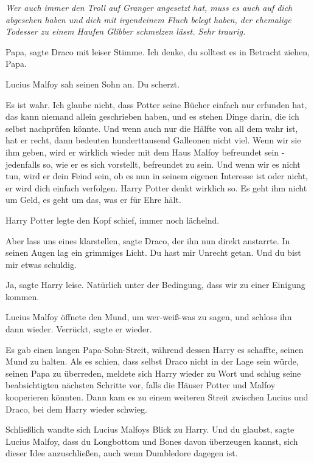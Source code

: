 \emph{Wer auch immer den Troll auf Granger angesetzt hat, muss es auch auf dich
abgesehen haben und dich mit irgendeinem Fluch belegt haben, der ehemalige
Todesser zu einem Haufen Glibber schmelzen lässt. Sehr traurig.}

\glqq{}Papa\grqq{}, sagte Draco mit leiser Stimme. \glqq{}Ich denke, du solltest
es in Betracht ziehen, Papa.\grqq{}

Lucius Malfoy sah seinen Sohn an. \glqq{}Du scherzt.\grqq{}

\glqq{}Es ist wahr. Ich glaube nicht, dass Potter seine Bücher einfach nur
erfunden hat, das kann niemand allein geschrieben haben, und es stehen Dinge
darin, die ich selbst nachprüfen könnte. Und wenn auch nur die Hälfte von all
dem wahr ist, hat er recht, dann bedeuten hunderttausend Galleonen nicht viel.
Wenn wir sie ihm geben, wird er wirklich wieder mit dem Haus Malfoy befreundet
sein - jedenfalls so, wie er es sich vorstellt, befreundet zu sein. Und wenn wir
es nicht tun, wird er dein Feind sein, ob es nun in seinem eigenen Interesse ist
oder nicht, er wird dich einfach verfolgen. Harry Potter denkt wirklich so. Es
geht ihm nicht um Geld, es geht um das, was er für Ehre hält.\grqq{}

Harry Potter legte den Kopf schief, immer noch lächelnd.

\glqq{}Aber lass uns eines klarstellen\grqq{}, sagte Draco, der ihn nun direkt
anstarrte. In seinen Augen lag ein grimmiges Licht. \glqq{}Du hast mir Unrecht
getan. Und du bist mir etwas schuldig.\grqq{}

\glqq{}Ja\grqq{}, sagte Harry leise. \glqq{}Natürlich unter der Bedingung, dass
wir zu einer Einigung kommen.\grqq{}

Lucius Malfoy öffnete den Mund, um wer-weiß-was zu sagen, und schloss ihn dann
wieder. \glqq{}Verrückt\grqq{}, sagte er wieder.

Es gab einen langen Papa-Sohn-Streit, während dessen Harry es schaffte, seinen
Mund zu halten. Als es schien, dass selbst Draco nicht in der Lage sein würde,
seinen Papa zu überreden, meldete sich Harry wieder zu Wort und schlug seine
beabsichtigten nächsten Schritte vor, falls die Häuser Potter und Malfoy
kooperieren könnten. Dann kam es zu einem weiteren Streit zwischen Lucius und
Draco, bei dem Harry wieder schwieg.

Schließlich wandte sich Lucius Malfoys Blick zu Harry. \glqq{}Und du
glaubst\grqq{}, sagte Lucius Malfoy, \glqq{}dass du Longbottom und Bones davon
überzeugen kannst, sich dieser Idee anzuschließen, auch wenn Dumbledore dagegen
ist.\grqq{}

